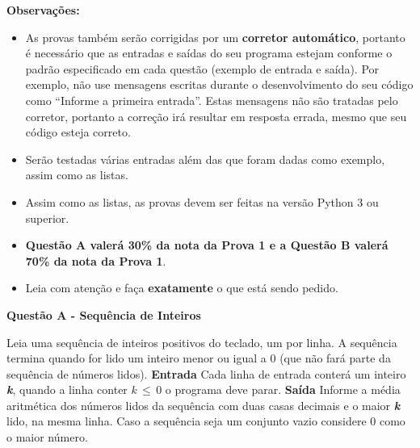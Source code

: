 \documentclass[a4paper, 12pt]{article}
\begin{document}
\textbf{{\large Observações:}}
\begin{itemize}
	\item As provas também serão corrigidas por um \textbf{corretor automático}, portanto é necessário que as entradas e saídas do seu programa estejam conforme o padrão especificado em cada questão (exemplo de entrada e saída). Por exemplo, não use mensagens escritas durante o desenvolvimento do seu código como “Informe a primeira entrada”. Estas mensagens não são tratadas pelo corretor, portanto a correção irá resultar em resposta errada, mesmo que seu código esteja correto.
	\item Serão testadas várias entradas além das que foram dadas como exemplo, assim como as listas.
	\item Assim como as listas, as provas devem ser feitas na versão Python 3 ou superior.
	\item \textbf{Questão A valerá 30\% da nota da Prova 1 e a Questão B valerá 70\% da nota da Prova 1}.
	\item Leia com atenção e faça \textbf{exatamente} o que está sendo pedido.
\end{itemize}
\newpage %
\begin{center}
\textbf{{\Large Questão A - Sequência de Inteiros}}
\end{center}
\vspace{5pt}
Leia uma sequência de inteiros positivos do teclado, um por linha. A sequência termina quando for lido um inteiro menor ou igual a 0 (que não fará parte da sequência de números lidos).
\newline \newline
\textbf{{\large Entrada}} \newline
Cada linha de entrada conterá um inteiro \textbf{\textit{k}}, quando a linha conter 
$k\, \leq \, 0$ o programa deve parar.
\newline \newline
\textbf{{\large Saída}} \newline
Informe a média aritmética dos números lidos da sequência com duas casas decimais e o maior \textbf{\textit{k}} lido, na mesma linha. Caso a sequência seja um conjunto vazio considere 0 como o maior número.
\newline
\end{document}
